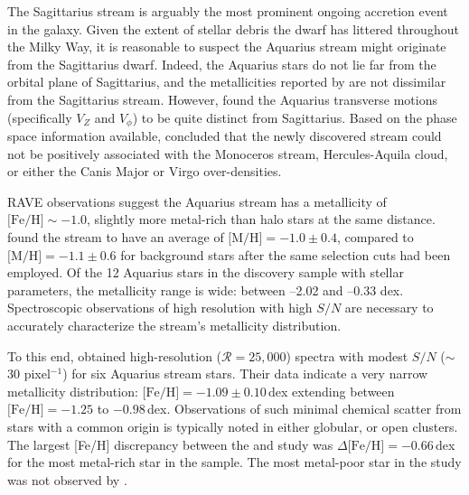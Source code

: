 \documentclass{emulateapj}
\begin{document}



The Sagittarius stream is arguably the most prominent ongoing accretion event in the galaxy. Given the extent of stellar debris the dwarf has littered throughout the Milky Way, it is reasonable to suspect the Aquarius stream might originate from the Sagittarius dwarf. Indeed, the Aquarius  stars do not lie far from the orbital plane of Sagittarius, and the metallicities reported by \citet{williams;et-al_2011} are not dissimilar from the Sagittarius stream. However, \citet{williams;et-al_2011} found the Aquarius transverse motions (specifically $V_{Z}$ and $V_\phi$) to be quite distinct from Sagittarius. Based on the phase space information available, \citet{williams;et-al_2011} concluded that the newly discovered stream could not be positively associated with the Monoceros stream, Hercules-Aquila cloud, or either the Canis Major or Virgo over-densities. 

RAVE observations suggest the Aquarius stream has a metallicity of $\mbox{[Fe/H]} \sim -1.0$, slightly more metal-rich than halo stars at the same distance. \citet{williams;et-al_2011} found the stream to have an average of $\mbox{[M/H]} = -1.0 \pm 0.4$, compared to $\mbox{[M/H]} = -1.1 \pm 0.6$ for background stars after the same selection cuts had been employed. Of the 12 Aquarius stars in the \citet{williams;et-al_2011} discovery sample with stellar parameters, the metallicity range is wide: between --2.02 and --0.33 dex. Spectroscopic observations of high resolution with high $S/N$ are necessary to accurately characterize the stream's metallicity distribution.

To this end, \citet{wylie-de-boer;et-al_2012} obtained high-resolution ($\mathcal{R} = 25,000$) spectra with modest $S/N$ ($\sim$30 pixel$^{-1}$) for six Aquarius stream stars. Their data indicate a very narrow metallicity distribution: $\mbox{[Fe/H]} = -1.09 \pm 0.10$\,dex extending between $\mbox{[Fe/H]} = -1.25$ to $-0.98$\,dex. Observations of such minimal chemical scatter from stars with a common origin is typically noted in either globular, or open clusters. The largest [Fe/H] discrepancy between the \citet{williams;et-al_2011} and \citet{wylie-de-boer;et-al_2012} study was $\Delta\mbox{[Fe/H]} = -0.66$\,dex for the most metal-rich star in the \citet{williams;et-al_2011} sample. The most metal-poor star in the \citet{williams;et-al_2011} study was not observed by \citet{wylie-de-boer;et-al_2012}. 
\end{document}
